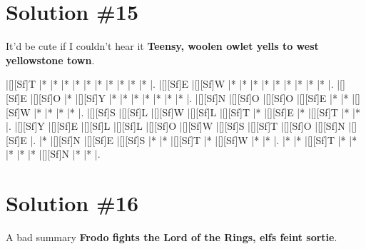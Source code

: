 \documentclass[letterpaper]{article}
\begin{document}
\newpage
\section*{Solution \#15}
It'd be cute if I couldn't hear it
\newline\textbf{Teensy, woolen owlet yells to west yellowstone town}.

\vspace*{1em}
\begin{Puzzle}{11}{9}
|[][Sf]T  |*        |*        |*        |*        |*        |*        |*        |*        |*        |*        |.
|[][Sf]E  |[][Sf]W  |*        |*        |*        |*        |*        |*        |*        |*        |*        |.
|[][Sf]E  |[][Sf]O  |*        |[][Sf]Y  |*        |*        |*        |*        |*        |*        |*        |.
|[][Sf]N  |[][Sf]O  |[][Sf]O  |[][Sf]E  |*        |*        |[][Sf]W  |*        |*        |*        |*        |.
|[][Sf]S  |[][Sf]L  |[][Sf]W  |[][Sf]L  |[][Sf]T  |*        |[][Sf]E  |*        |[][Sf]T  |*        |*        |.
|[][Sf]Y  |[][Sf]E  |[][Sf]L  |[][Sf]L  |[][Sf]O  |[][Sf]W  |[][Sf]S  |[][Sf]T  |[][Sf]O  |[][Sf]N  |[][Sf]E  |.
|*        |[][Sf]N  |[][Sf]E  |[][Sf]S  |*        |*        |[][Sf]T  |*        |[][Sf]W  |*        |*        |.
|*        |*        |[][Sf]T  |*        |*        |*        |*        |*        |[][Sf]N  |*        |*        |.
\end{Puzzle}

\newpage
\section*{Solution \#16}
A bad summary
\newline\textbf{Frodo fights the Lord of the Rings, elfs feint sortie}.
\end{document}
